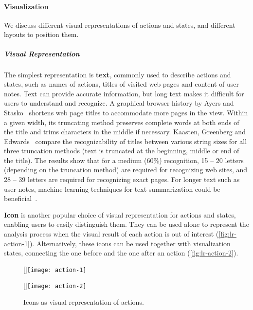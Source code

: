 \paragraph{Visualization}
We discuss different visual representations of actions and states, and different layouts to position them.
 
\subparagraph{Visual Representation}
The simplest representation is \textbf{text}, commonly used to describe actions and states, such as names of actions, titles of visited web pages and content of user notes. Text can provide accurate information, but long text makes it difficult for users to understand and recognize. A graphical browser history by Ayers and Stasko~\cite{Ayers1995} shortens web page titles to accommodate more pages in the view. Within a given width, its truncating method preserves complete words at both ends of the title and trims characters in the middle if necessary. Kaasten, Greenberg and Edwards~\cite{Kaasten2001} compare the recognizability of titles between various string sizes for all three truncation methods (text is truncated at the beginning, middle or end of the title). The results show that for a medium (60\%) recognition, 15 -- 20 letters (depending on
the truncation method) are required for recognizing web sites, and 28 -- 39 letters are required for recognizing exact pages. For longer text such as user notes, machine learning techniques for text summarization could be beneficial~\cite{Nenkova2012}.

\textbf{Icon} is another popular choice of visual representation for actions and states, enabling users to easily distinguish them. They can be used alone to represent the analysis process when the visual result of each action is out of interest (\autoref{fig:lr-action-1}). Alternatively, these icons can be used together with visualization states, connecting the one before and the one after an action (\autoref{fig:lr-action-2}).

\begin{figure}[!htb]
\centering
{}[\columnwidth]{\texttt{[image: action-1]}}

\vspace{.5\baselineskip}

[\columnwidth]{\texttt{[image: action-2]}}
\caption{Icons as visual representation of actions.}
\end{figure}

